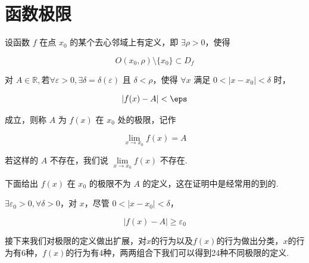 \section{函数极限}
\begin{definition}\label{def1}
	设函数 $f$ 在点 $x_0$ 的某个去心邻域上有定义，即 $\exists \rho > 0$，使得
	
	$$
	O(x_0, \rho) \setminus \{x_0\} \subset D_f
	$$
	
	对 $A \in \mathbb{R},\text{若} \forall \varepsilon > 0, \exists \delta = \delta(\varepsilon) $ 且 $\delta < \rho$，使得 $\forall x$ 满足 $0 < |x - x_0| < \delta$ 时，
	
	$$
	|f(x) - A| < \eps
	$$
	
	成立，则称 $A$ 为 $f(x)$ 在 $x_0$ 处的极限，记作
	
	$$
	\lim_{x \to x_0} f(x) = A
	$$
	
	若这样的 $A$ 不存在，我们说 $\lim\limits_{x \to x_0} f(x)$ 不存在.
\end{definition}
下面给出 $f(x)$ 在 $x_0$ 的极限不为 $A$ 的定义，这在证明中是经常用的到的.
\begin{definition}\label{nopro}
	$\exists \varepsilon_0 > 0, \forall \delta > 0$，对 $x$，尽管 $0 < |x - x_0| < \delta$，
	
	$$
	|f(x) - A| \geqslant \varepsilon_0
	$$
\end{definition}
接下来我们对极限的定义做出扩展，对$x$的行为以及$f(x)$的行为做出分类，$x$的行为有6种，$f(x)$的行为有4种，两两组合下我们可以得到24种不同极限的定义.

